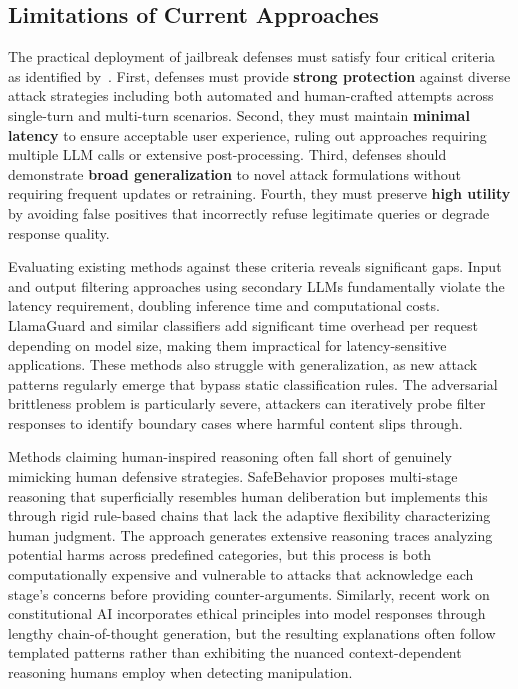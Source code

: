 \subsection{Limitations of Current Approaches}

The practical deployment of jailbreak defenses must satisfy four critical criteria as identified by~\cite{wang2024selfdefend}. First, defenses must provide \textbf{strong protection} against diverse attack strategies including both automated and human-crafted attempts across single-turn and multi-turn scenarios. Second, they must maintain \textbf{minimal latency} to ensure acceptable user experience, ruling out approaches requiring multiple LLM calls or extensive post-processing. Third, defenses should demonstrate \textbf{broad generalization} to novel attack formulations without requiring frequent updates or retraining. Fourth, they must preserve \textbf{high utility} by avoiding false positives that incorrectly refuse legitimate queries or degrade response quality.

Evaluating existing methods against these criteria reveals significant gaps. Input and output filtering approaches using secondary LLMs fundamentally violate the latency requirement, doubling inference time and computational costs. LlamaGuard and similar classifiers add significant time overhead per request depending on model size, making them impractical for latency-sensitive applications. These methods also struggle with generalization, as new attack patterns regularly emerge that bypass static classification rules. The adversarial brittleness problem is particularly severe, attackers can iteratively probe filter responses to identify boundary cases where harmful content slips through.

Methods claiming human-inspired reasoning often fall short of genuinely mimicking human defensive strategies. SafeBehavior \cite{guan2024safebehavior} proposes multi-stage reasoning that superficially resembles human deliberation but implements this through rigid rule-based chains that lack the adaptive flexibility characterizing human judgment. The approach generates extensive reasoning traces analyzing potential harms across predefined categories, but this process is both computationally expensive and vulnerable to attacks that acknowledge each stage's concerns before providing counter-arguments. Similarly, recent work on constitutional AI \cite{bai2022constitutional} incorporates ethical principles into model responses through lengthy chain-of-thought generation, but the resulting explanations often follow templated patterns rather than exhibiting the nuanced context-dependent reasoning humans employ when detecting manipulation.

